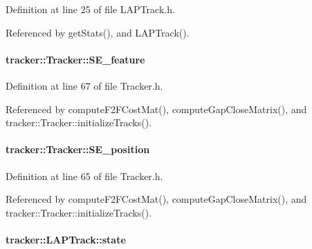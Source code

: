 Definition at line 25 of file L\+A\+P\+Track.\+h.



Referenced by get\+Stats(), and L\+A\+P\+Track().

\paragraph[{\texorpdfstring{S\+E\+\_\+feature}{SE_feature}}]{ tracker\+::\+Tracker\+::\+S\+E\+\_\+feature\hspace{0.3cm}{\ttfamily [inherited]}}\hypertarget{classtracker_1_1Tracker_a0aa2719b06bfd7b630628486b67ca5fd}{}\label{classtracker_1_1Tracker_a0aa2719b06bfd7b630628486b67ca5fd}


Definition at line 67 of file Tracker.\+h.



Referenced by compute\+F2\+F\+Cost\+Mat(), compute\+Gap\+Close\+Matrix(), and tracker\+::\+Tracker\+::initialize\+Tracks().

\paragraph[{\texorpdfstring{S\+E\+\_\+position}{SE_position}}]{ tracker\+::\+Tracker\+::\+S\+E\+\_\+position\hspace{0.3cm}{\ttfamily [inherited]}}\hypertarget{classtracker_1_1Tracker_acd4e8651a05dff9170230149b7fe0029}{}\label{classtracker_1_1Tracker_acd4e8651a05dff9170230149b7fe0029}


Definition at line 65 of file Tracker.\+h.



Referenced by compute\+F2\+F\+Cost\+Mat(), compute\+Gap\+Close\+Matrix(), and tracker\+::\+Tracker\+::initialize\+Tracks().

\paragraph[{\texorpdfstring{state}{state}}]{ tracker\+::\+L\+A\+P\+Track\+::state\hspace{0.3cm}{\ttfamily [protected]}}\hypertarget{classtracker_1_1LAPTrack_a0e74c48780822951efdc3570348a3dd5}{}\label{classtracker_1_1LAPTrack_a0e74c48780822951efdc3570348a3dd5}


